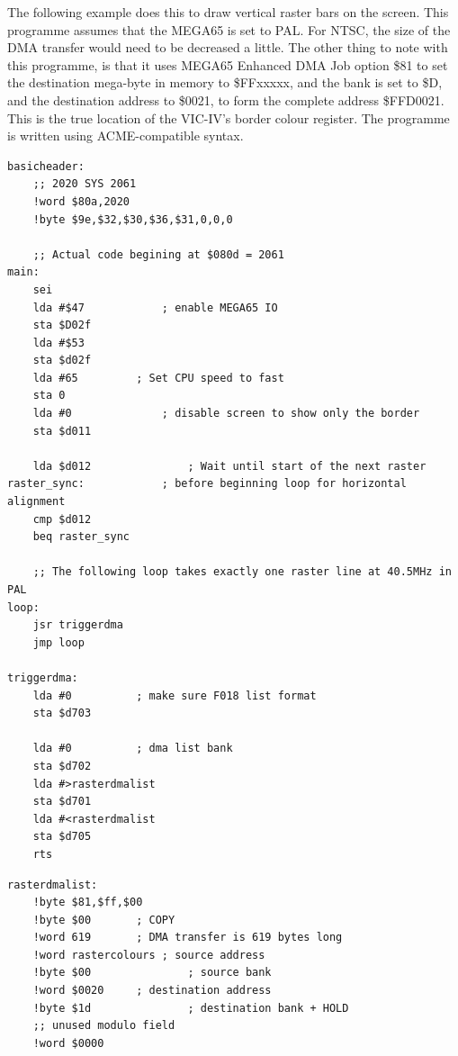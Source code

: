 The following example does this to draw vertical raster bars on the screen.
This programme assumes that the MEGA65 is set to PAL.  For NTSC, the size of the DMA transfer
would need to be decreased a little.  The other thing to note with this programme, is that
it uses MEGA65 Enhanced DMA Job option \$81 to set the destination mega-byte in memory to
\$FFxxxxx, and the bank is set to \$D, and the destination address to \$0021, to form the
complete address \$FFD0021.  This is the true location of the VIC-IV's border colour register.
The programme is written using ACME-compatible syntax.

\begin{tcolorbox}[colback=black,coltext=white]
\verbatimfont{\codefont}
\begin{verbatim}
basicheader:
	;; 2020 SYS 2061
	!word $80a,2020
	!byte $9e,$32,$30,$36,$31,0,0,0

	;; Actual code begining at $080d = 2061
main:
	sei
	lda #$47        	; enable MEGA65 IO
	sta $D02f
	lda #$53
	sta $d02f
	lda #65 		; Set CPU speed to fast
	sta 0
	lda #0            	; disable screen to show only the border
	sta $d011

	lda $d012              	; Wait until start of the next raster
raster_sync:	  		; before beginning loop for horizontal alignment
	cmp $d012
	beq raster_sync

	;; The following loop takes exactly one raster line at 40.5MHz in PAL
loop:
	jsr triggerdma
	jmp loop

triggerdma:
	lda #0			; make sure F018 list format
	sta $d703

	lda #0     		; dma list bank
	sta $d702
	lda #>rasterdmalist
	sta $d701
	lda #<rasterdmalist
	sta $d705
	rts
\end{verbatim}
\end{tcolorbox}

\begin{tcolorbox}[colback=black,coltext=white]
\verbatimfont{\codefont}
\begin{verbatim}
rasterdmalist:
	!byte $81,$ff,$00
	!byte $00 		; COPY
	!word 619 		; DMA transfer is 619 bytes long
	!word rastercolours	; source address
	!byte $00               ; source bank
	!word $0020		; destination address
	!byte $1d               ; destination bank + HOLD
	;; unused modulo field
	!word $0000
\end{verbatim}
\end{tcolorbox}

